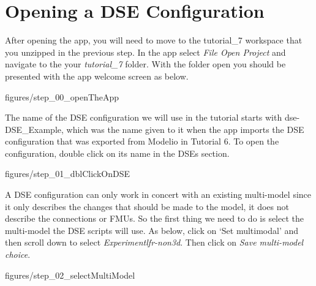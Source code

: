 \documentclass[11pt,a4paper]{../tutorial}
\begin{document}
\newpage

\section{Opening a DSE Configuration}

After opening the app, you will need to move to the tutorial\_7 workspace that you unzipped in the previous step.  In the app select \emph{File \menusep Open Project} and navigate to the your \emph{tutorial\_7} folder.  With the folder open you should be presented with the app welcome screen as below.

\begin{center}\begin{annotation}[width=0.7\linewidth,trim=0 0 0 0,clip]{figures/step_00_openTheApp}
\end{annotation}\end{center}

The name of the DSE configuration we will use in the tutorial starts with dse-DSE\_Example, which was the name given to it when the app imports the DSE configuration that was exported from Modelio in Tutorial 6.  
To open the configuration, double click on its name in the DSEs section.


\begin{center}\begin{annotation}[width=0.7\linewidth,trim=0 0 0 0,clip]{figures/step_01_dblClickOnDSE}
\end{annotation}\end{center}

A DSE configuration can only work in concert with an existing multi-model since it only describes the changes that should be made to the model, it does not describe the connections or FMUs.  So the first thing we need to do is select the multi-model the DSE scripts will use.  As below, click on ‘Set multimodal’ and then scroll down to select \emph{Experiment\pathsep{}lfr-non3d}.  Then click on \emph{Save multi-model choice}.


\begin{center}\begin{annotation}[width=0.7\linewidth,trim=0 0 0 0,clip]{figures/step_02_selectMultiModel}
\end{annotation}\end{center}
\end{document}
